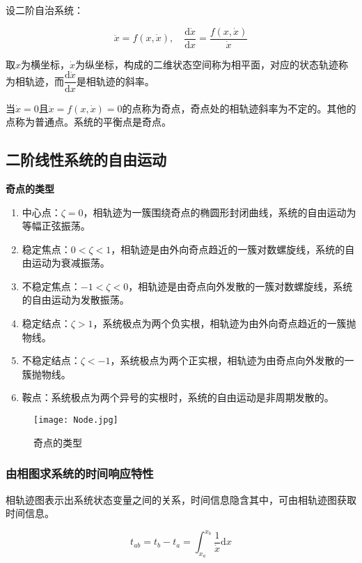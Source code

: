 \documentclass[cn, blue, normal, 12pt]{elegantnote}
\begin{document}
设二阶自治系统：

\begin{equation}
    \ddot{x}=f(x,\dot{x}), \quad \frac{\mathrm{d}\dot{x}}{{\mathrm{d}x}}=\frac{f(x,\dot{x})}{\dot{x}}
\end{equation}

取$x$为横坐标，$\dot{x}$为纵坐标，构成的二维状态空间称为相平面，对应的状态轨迹称为相轨迹，而$\dfrac{\mathrm{d}\dot{x}}{\mathrm{d}x}$是相轨迹的斜率。

当$\dot{x}=0$且$\ddot{x}=f(x,\dot{x})=0$的点称为奇点，奇点处的相轨迹斜率为不定的。其他的点称为普通点。系统的平衡点是奇点。

\subsection{二阶线性系统的自由运动}

\textbf{奇点的类型}

\begin{enumerate}
    \setlength{\itemsep}{6pt}
    \item 中心点：$\zeta=0$，相轨迹为一簇围绕奇点的椭圆形封闭曲线，系统的自由运动为等幅正弦振荡。
    \item 稳定焦点：$0<\zeta<1$，相轨迹是由外向奇点趋近的一簇对数螺旋线，系统的自由运动为衰减振荡。
    \item 不稳定焦点：$-1<\zeta<0$，相轨迹是由奇点向外发散的一簇对数螺旋线，系统的自由运动为发散振荡。
    \item 稳定结点：$\zeta>1$，系统极点为两个负实根，相轨迹为由外向奇点趋近的一簇抛物线。
    \item 不稳定结点：$\zeta<-1$，系统极点为两个正实根，相轨迹为由奇点向外发散的一簇抛物线。
    \item 鞍点：系统极点为两个异号的实根时，系统的自由运动是非周期发散的。
\end{enumerate}

\begin{figure}[htbp]
    \centering
    \texttt{[image: Node.jpg]}
    \caption{奇点的类型}
\end{figure}

\subsubsection{由相图求系统的时间响应特性}

相轨迹图表示出系统状态变量之间的关系，时间信息隐含其中，可由相轨迹图获取时间信息。

\begin{equation}
    t_{ab}=t_b-t_a=\int_{x_a}^{x_b}\frac{1}{\dot{x}}\mathrm{d}x
\end{equation}
\end{document}
